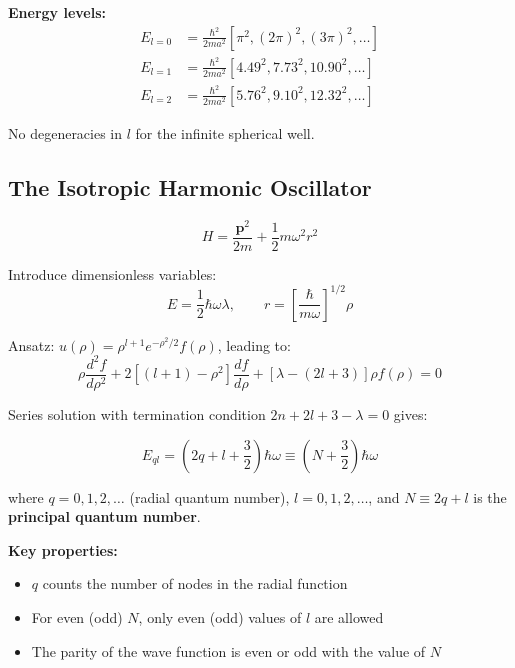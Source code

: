 \documentclass[11pt,a4paper]{article}
\begin{document}
\textbf{Energy levels:}
\begin{align}
E_{l=0} &= \frac{\hbar^2}{2ma^2}[\pi^2, (2\pi)^2, (3\pi)^2, \ldots] \tag{3.287} \\
E_{l=1} &= \frac{\hbar^2}{2ma^2}[4.49^2, 7.73^2, 10.90^2, \ldots] \tag{3.288} \\
E_{l=2} &= \frac{\hbar^2}{2ma^2}[5.76^2, 9.10^2, 12.32^2, \ldots] \tag{3.289}
\end{align}

No degeneracies in $l$ for the infinite spherical well.

\subsection{The Isotropic Harmonic Oscillator}

\begin{equation}
H = \frac{\mathbf{p}^2}{2m} + \frac{1}{2}m\omega^2 r^2
\tag{3.290}
\end{equation}

Introduce dimensionless variables:
\begin{equation}
E = \frac{1}{2}\hbar\omega\lambda, \qquad r = \left[\frac{\hbar}{m\omega}\right]^{1/2}\rho
\tag{3.291}
\end{equation}

Ansatz: $u(\rho) = \rho^{l+1}e^{-\rho^2/2}f(\rho)$, leading to:
\begin{equation}
\rho\frac{d^2 f}{d\rho^2} + 2[(l+1) - \rho^2]\frac{df}{d\rho} + [\lambda - (2l+3)]\rho f(\rho) = 0
\tag{3.294}
\end{equation}

Series solution with termination condition $2n + 2l + 3 - \lambda = 0$ gives:

\begin{equation}
\boxed{E_{ql} = \left(2q + l + \frac{3}{2}\right)\hbar\omega \equiv \left(N + \frac{3}{2}\right)\hbar\omega}
\tag{3.302}
\end{equation}

where $q = 0, 1, 2, \ldots$ (radial quantum number), $l = 0, 1, 2, \ldots$, and $N \equiv 2q + l$ is the \textbf{principal quantum number}.

\textbf{Key properties:}
\begin{itemize}
\item $q$ counts the number of nodes in the radial function
\item For even (odd) $N$, only even (odd) values of $l$ are allowed
\item The parity of the wave function is even or odd with the value of $N$
\end{itemize}
\end{document}
